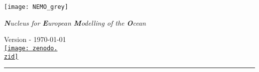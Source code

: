 
\begin{titlepage}
   \setlength{\parindent}{0pt}

   \begin{center}

      \begin{minipage}{0.3\textwidth}
         \texttt{[image: NEMO\_grey]}
      \end{minipage} %
      \begin{minipage}{0.6\textwidth}
         \begin{center}
            \Large\slshape
            \textbf{N}ucleus for \textbf{E}uropean \textbf{M}odelling of the \textbf{O}cean \\
            \medskip
            \hyperref[resources]{
               \faWordpress \hspace{1cm} \faCodeFork      \hspace{1cm}
               \faGithub    \hspace{1cm} \faCloudDownload \hspace{1cm} \faEnvelope
            }
         \end{center}
      \end{minipage}

   \end{center}

   \spcup
   \textcolor{white}{\fontsize{0.8cm}{0.8cm}\selectfont\textbf{\hdg}}
   \ifdef{\shdg}{\medskip\par\textcolor{white}{\Huge\shdg}}{}
   \spcdn

   \begin{center}
      \LARGE Version {\ver} - {\today} \\
      \medskip
      \href{http://doi.org/10.5281/zenodo.\zid}{\texttt{[image: zenodo.\\zid]}}
   \end{center}

   \vfill

   \begin{minipage}{\autwd}
      \raggedleft
   \end{minipage}
   \hspace{15pt} %
   \begin{minipage}{0.02\linewidth}
      \rule{1pt}{\lnlg}
   \end{minipage}
   \hspace{ 5pt} %
   \begin{minipage}{\abswd}
      \begin{abstract}
         
      \end{abstract}
   \end{minipage}


\end{titlepage}

